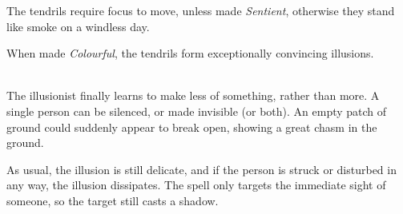 \begin{multicols}{2}
The tendrils require focus to move, unless made \textit{Sentient}, otherwise they stand like smoke on a windless day.

When made \textit{Colourful}, the tendrils form exceptionally convincing illusions.

\\
The illusionist finally learns to make less of something, rather than more.  A single person can be silenced, or made invisible (or both).
An empty patch of ground could suddenly appear to break open, showing a great chasm in the ground.

As usual, the illusion is still delicate, and if the person is struck or disturbed in any way, the illusion dissipates.
The spell only targets the immediate sight of someone, so the target still casts a shadow\iftoggle{verbose}{(though the caster can still remove this with the Muffle spell, above)}{}.

\end{multicols}


